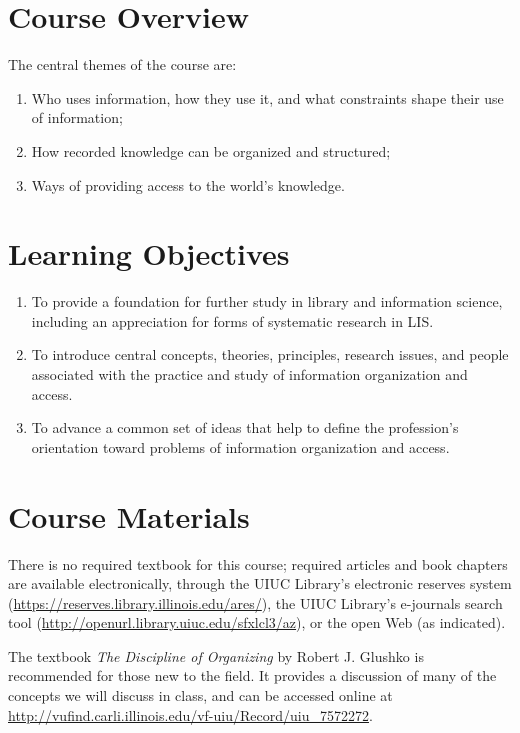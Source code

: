 \documentclass[]{article}
\providecommand{\tightlist}{%
  \setlength{\itemsep}{0pt}\setlength{\parskip}{0pt}}
\begin{document}
\section{Course Overview}\label{course-overview}

The central themes of the course are:

\begin{enumerate}
\def\labelenumi{\arabic{enumi}.}
\tightlist
\item
  Who uses information, how they use it, and what constraints shape
  their use of information;
\item
  How recorded knowledge can be organized and structured;
\item
  Ways of providing access to the world's knowledge.
\end{enumerate}

\section{Learning Objectives}\label{learning-objectives}

\begin{enumerate}
\def\labelenumi{\arabic{enumi}.}
\tightlist
\item
  To provide a foundation for further study in library and information
  science, including an appreciation for forms of systematic research in
  LIS.
\item
  To introduce central concepts, theories, principles, research issues,
  and people associated with the practice and study of information
  organization and access.
\item
  To advance a common set of ideas that help to define the profession's
  orientation toward problems of information organization and access.
\end{enumerate}

\section{Course Materials}\label{course-materials}

There is no required textbook for this course; required articles and
book chapters are available electronically, through the UIUC Library's
electronic reserves system
(\url{https://reserves.library.illinois.edu/ares/}), the UIUC Library's
e-journals search tool
(\url{http://openurl.library.uiuc.edu/sfxlcl3/az}), or the open Web (as
indicated).

The textbook \emph{The Discipline of Organizing} by Robert J. Glushko is
recommended for those new to the field. It provides a discussion of many
of the concepts we will discuss in class, and can be accessed online at
\url{http://vufind.carli.illinois.edu/vf-uiu/Record/uiu_7572272}.
\end{document}
